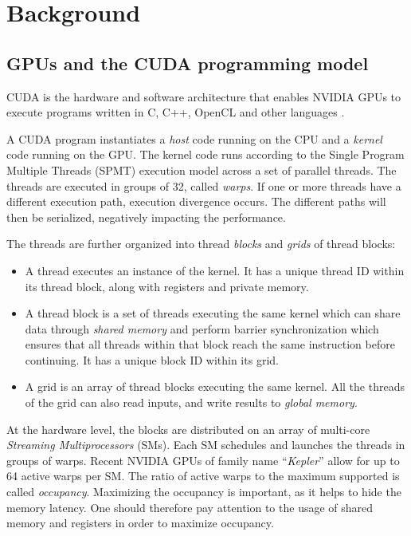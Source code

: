 \documentclass[runningheads,orivec]{llncs}
\begin{document}
\vspace*{-0.25cm}
\section{Background}
\label{Background}
\vspace*{-0.25cm}

\subsection{GPUs and the CUDA programming model}
\vspace*{-0.25cm}

CUDA is the hardware and software architecture that enables NVIDIA GPUs to execute programs written in C, C++, OpenCL and other languages \cite{CUDA42}.

A CUDA program instantiates a \textit{host} code running on the CPU and a \textit{kernel} code running on the GPU. The kernel code runs according to the Single Program Multiple Threads (SPMT) execution model across a set of parallel threads. The threads are executed in groups of 32, called \textit{warps}. If one or more threads have a different execution path, execution divergence occurs. The different paths will then be serialized, negatively impacting the performance. 

The threads are further organized into thread \textit{blocks} and \textit{grids} of thread blocks:
\begin{itemize}
\vspace*{-0.25cm}

\item A thread executes an instance of the kernel. It has a unique thread ID within its thread block, along with registers and private memory.
\item A thread block is a set of threads executing the same kernel which can share data through \textit{shared memory} and perform barrier synchronization which ensures that all threads within that block reach the same instruction before continuing. It has a unique block ID within its grid.
\item A grid is an array of thread blocks executing the same kernel. All the threads of the grid can also read inputs, and write results to \textit{global memory}. 
\end{itemize}

At the hardware level, the blocks are distributed on an array of multi-core \textit{Streaming Multiprocessors} (SMs). Each SM schedules and launches the threads in groups of warps. Recent NVIDIA GPUs of family name ``\textit{Kepler}'' allow for up to 64 active warps per SM. The ratio of active warps to the maximum supported is called \textit{occupancy}. Maximizing the occupancy is important, as it helps to hide the memory latency. One should therefore pay attention to the usage of shared memory and registers in order to maximize occupancy.
\end{document}
